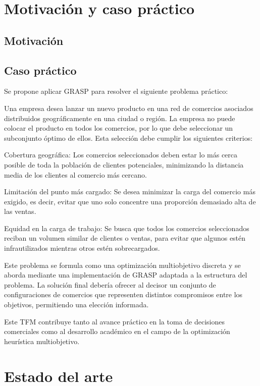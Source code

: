\documentclass[12pt,a4paper]{book}
\begin{document}
\section{Motivación y caso práctico}

\subsection{Motivación}



\subsection{Caso práctico}

Se propone aplicar GRASP para resolver el siguiente problema práctico:

Una empresa desea lanzar un nuevo producto en una red de comercios asociados distribuidos geográficamente en una ciudad o región. La empresa no puede colocar el producto en todos los comercios, por lo que debe seleccionar un subconjunto óptimo de ellos. Esta selección debe cumplir los siguientes criterios:

Cobertura geográfica: Los comercios seleccionados deben estar lo más cerca posible de toda la población de clientes potenciales, minimizando la distancia media de los clientes al comercio más cercano.

Limitación del punto más cargado: Se desea minimizar la carga del comercio más exigido, es decir, evitar que uno solo concentre una proporción demasiado alta de las ventas.

Equidad en la carga de trabajo: Se busca que todos los comercios seleccionados reciban un volumen similar de clientes o ventas, para evitar que algunos estén infrautilizados mientras otros estén sobrecargados.

Este problema se formula como una optimización multiobjetivo discreta y se aborda mediante una implementación de GRASP adaptada a la estructura del problema. La solución final debería ofrecer al decisor un conjunto de configuraciones de comercios que representen distintos compromisos entre los objetivos, permitiendo una elección informada.

Este TFM contribuye tanto al avance práctico en la toma de decisiones comerciales como al desarrollo académico en el campo de la optimización heurística multiobjetivo.

\section{Estado del arte}
\end{document}
